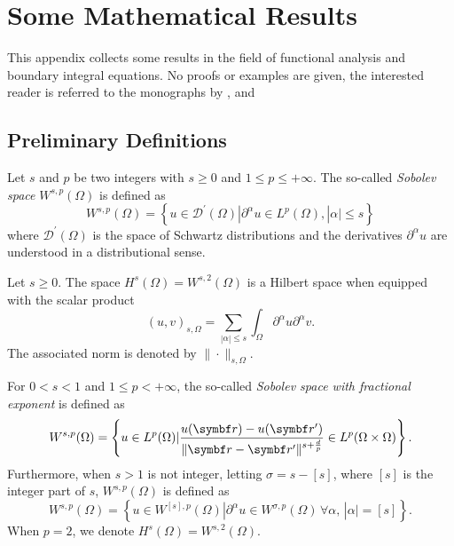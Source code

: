 \chapter{Some Mathematical Results}\label{app:mathematical-results}

This appendix collects some results in the field of functional analysis and
boundary integral equations. No proofs or examples are given, the interested
reader is referred to the monographs by \citeauthor{Ern2004-oo},
\citeauthor{Hsiao2008-xb} and \citeauthor{Sauter2011-an}\autocite{Ern2004-oo,
Hsiao2008-xb, Sauter2011-an}

\section{Preliminary Definitions}

\begin{defin}
Let $s$ and $p$ be two integers with $s\geq 0$ and $1\leq p \leq +\infty$.
The so-called \emph{Sobolev space} $W^{s, p}(\Omega)$ is defined as
\begin{equation}
W^{s,p}(\Omega) =
\left\lbrace
u \in \mathcal{D}^\prime(\Omega) | \partial^\alpha u \in L^p(\Omega), |\alpha|\leq s
\right\rbrace
\end{equation}
where $\mathcal{D}^\prime(\Omega)$ is the space of Schwartz distributions and the
derivatives $\partial^\alpha u$ are understood in a distributional sense.
\end{defin}

\begin{lemma}
Let $s\geq 0$. The space $H^s(\Omega) = W^{s, 2}(\Omega)$ is a Hilbert space
when equipped with the scalar product
\begin{equation}
(u, v)_{s, \Omega} = \sum_{|\alpha|\leq s}\int_\Omega\partial^\alpha u \partial^\alpha v.
\end{equation}
The associated norm is denoted by $\| \cdot \|_{s, \Omega}$.
\end{lemma}

\begin{defin}
For $0 < s < 1$ and $1 \leq p < +\infty$, the so-called \emph{Sobolev space with fractional
exponent} is defined as
\begin{equation}
W^{s, p}(\Omega) =
\left\lbrace
u \in L^p(\Omega) |
\frac{u(\vect{r}) - u(\vect{r}^\prime)}{\| \vect{r} - \vect{r}^\prime\|^{s+\frac{d}{p}}}
\in L^p(\Omega \times \Omega)
\right\rbrace.
\end{equation}
Furthermore, when $s> 1$ is not integer, letting $\sigma = s - [s]$, where $[s]$ is the integer
part of $s$, $W^{s,p}(\Omega)$ is defined as
\begin{equation}
W^{s, p}(\Omega) =
\left\lbrace
u \in W^{[s], p}(\Omega) |
\partial^\alpha u \in W^{\sigma, p}(\Omega)\, \forall \alpha,\, |\alpha| = [s]
\right\rbrace.
\end{equation}
When $p=2$, we denote $H^s(\Omega) = W^{s,2}(\Omega)$.
\end{defin}


